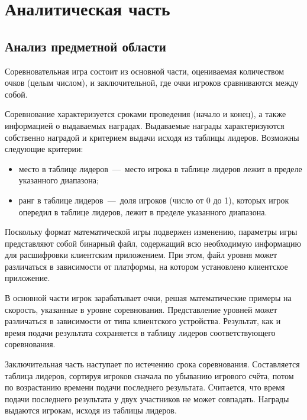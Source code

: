 \chapter{Аналитическая часть}

\section{Анализ предметной области}

Соревновательная игра состоит из основной части, оцениваемая количеством очков (целым числом), и заключительной, где очки игроков сравниваются между собой.

Соревнование характеризуется сроками проведения (начало и конец), а также информацией о выдаваемых наградах. Выдаваемые награды характеризуются собственно наградой и критерием выдачи исходя из таблицы лидеров. Возможны следующие критерии:
\begin{itemize}
	\item место в таблице лидеров~---~место игрока в таблице лидеров лежит в пределе указанного диапазона;
	\item ранг в таблице лидеров~---~доля игроков (число от 0 до 1), которых игрок опередил в таблице лидеров, лежит в пределе указанного диапазона.
\end{itemize}
Поскольку формат математической игры подвержен изменению, параметры игры представляют собой бинарный файл, содержащий всю необходимую информацию для расшифровки клиентским приложением. При этом, файл уровня может различаться в зависимости от платформы, на котором установлено клиентское приложение.



В основной части игрок зарабатывает очки, решая математические примеры на скорость, указанные в уровне соревнования. Представление уровней может различаться в зависимости от типа клиентского устройства. Результат, как и время подачи результата сохраняется в таблицу лидеров соответствующего соревнования.

Заключительная часть наступает по истечению срока соревнования. Составляется таблица лидеров, сортируя игроков сначала по убыванию игрового счёта, потом по возрастанию времени подачи последнего результата. Считается, что время подачи последнего результата у двух участников не может совпадать. Награды выдаются игрокам, исходя из таблицы лидеров. 


